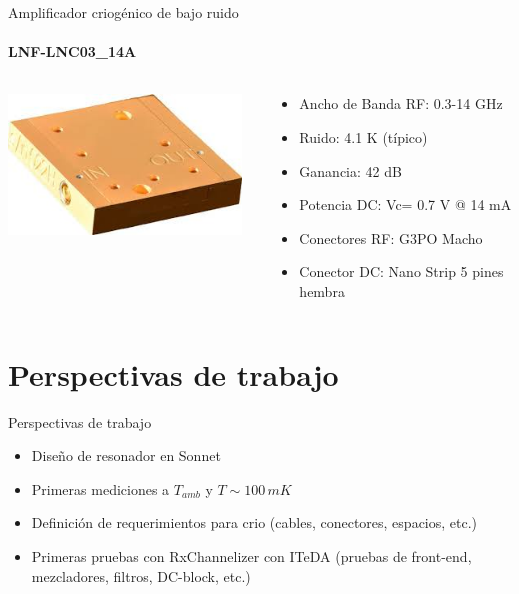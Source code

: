 \documentclass[ignorenonframetext,12pt]{beamer}
\begin{document}
				\begin{frame}{Amplificador criog\'enico de bajo ruido}
								\framesubtitle{LNF-LNC03\_14A}
								\begin{columns}
												\begin{column}{0.40\textwidth}
				\hspace{10mm}\includegraphics[width=0.95\textwidth]{lnf-lnc03_14sa}
												\end{column}
												\begin{column}{0.60\textwidth}
																\begin{itemize}
																				\item Ancho de Banda RF: 0.3-14 GHz
																				\item Ruido: 4.1 K (típico)
																				\item Ganancia: 42 dB
																				\item Potencia DC: Vc= 0.7 V @ 14 mA
																				\item Conectores RF: G3PO Macho
																				\item Conector DC: Nano Strip 5 pines hembra
																\end{itemize}
												\end{column}
								\end{columns}
				\end{frame}



\section{Perspectivas de trabajo}
\begin{frame}{Perspectivas de trabajo}
				\begin{itemize}
								\item Dise\~no de resonador en Sonnet
								\item Primeras mediciones a $T_{amb}$ y $T \sim 100\,mK$
								\item Definici\'on de requerimientos para crio (cables,
												conectores, espacios, etc.)
								\item Primeras pruebas con RxChannelizer con ITeDA (pruebas de
												front-end, mezcladores, filtros, DC-block, etc.)
				\end{itemize}
\end{frame}
\end{document}
